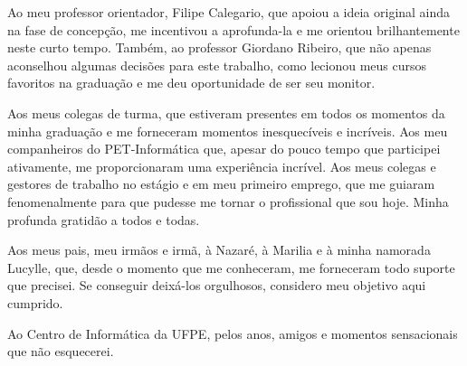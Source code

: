 \acknowledgements

Ao meu professor orientador, Filipe Calegario, que apoiou a ideia original ainda na fase de concepção, me incentivou a aprofunda-la e me orientou brilhantemente neste curto tempo. Também, ao professor Giordano Ribeiro, que não apenas aconselhou algumas decisões para este trabalho, como lecionou meus cursos favoritos na graduação e me deu oportunidade de ser seu monitor.

Aos meus colegas de turma, que estiveram presentes em todos os momentos da minha graduação e me forneceram momentos inesquecíveis e incríveis. Aos meu companheiros do PET-Informática que, apesar do pouco tempo que participei ativamente, me proporcionaram uma experiência incrível. Aos meus colegas e gestores de trabalho no estágio e em meu primeiro emprego, que me guiaram fenomenalmente para que pudesse me tornar o profissional que sou hoje. Minha profunda gratidão a todos e todas.

Aos meus pais, meu irmãos e irmã, à Nazaré, à Marilia e à minha namorada Lucylle, que, desde o momento que me conheceram, me forneceram todo suporte que precisei. Se conseguir deixá-los orgulhosos, considero meu objetivo aqui cumprido.

Ao Centro de Informática da UFPE, pelos anos, amigos e momentos sensacionais que não esquecerei.